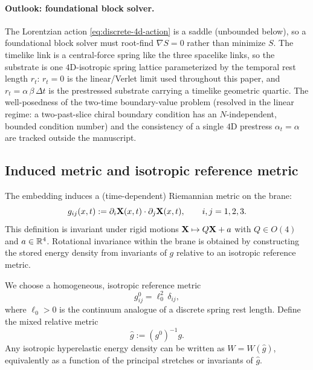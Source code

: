 \paragraph{Outlook: foundational block solver.}
The Lorentzian action \eqref{eq:discrete-4d-action} is a saddle (unbounded below), so a foundational block solver must root-find $\nabla S=0$ rather than minimize $S$.
The timelike link is a central-force spring like the three spacelike links, so the substrate is one $4$D-isotropic spring lattice parameterized by the temporal rest length $r_t$: $r_t=0$ is the linear/Verlet limit used throughout this paper, and $r_t=\alpha\,\beta\,\Delta t$ is the prestressed substrate carrying a timelike geometric quartic. The well-posedness of the two-time boundary-value problem (resolved in the linear regime: a two-past-slice chiral boundary condition has an $N$-independent, bounded condition number) and the consistency of a single $4$D prestress $\alpha_t=\alpha$ are tracked outside the manuscript.

\subsection{Induced metric and isotropic reference metric}

The embedding induces a (time-dependent) Riemannian metric on the brane:
\begin{equation}
  g_{ij}(x,t) := \partial_i \mathbf{X}(x,t)\cdot \partial_j \mathbf{X}(x,t),
  \qquad i,j=1,2,3.
  \label{eq:induced-metric}
\end{equation}
This definition is invariant under rigid motions $\mathbf{X}\mapsto Q\mathbf{X}+a$ with $Q\in O(4)$ and $a\in\mathbb{R}^4$.
Rotational invariance within the brane is obtained by constructing the stored energy density from invariants of $g$
relative to an isotropic reference metric.

We choose a homogeneous, isotropic reference metric
\begin{equation}
  g^0_{ij}=\ell_0^2\,\delta_{ij},
  \label{eq:reference-metric}
\end{equation}
where $\ell_0>0$ is the continuum analogue of a discrete spring rest length.
Define the mixed relative metric
\begin{equation}
  \widehat g := (g^0)^{-1}g.
  \label{eq:relative-metric}
\end{equation}
Any isotropic hyperelastic energy density can be written as $W=W(\widehat g)$, equivalently as a function of the
principal stretches or invariants of $\widehat g$.

